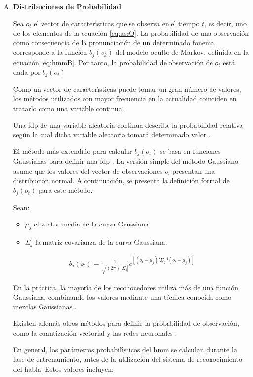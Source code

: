 \begin{enumerate}[A)]
	\item \textbf{Distribuciones de Probabilidad}

	Sea $o_t$ el vector de caracter{\'\i}sticas que se observa en el tiempo $t$, es decir, uno de los elementos
	de la ecuaci\'on \ref{eq:asrO}.
	La probabilidad de una observaci\'on como consecuencia de la pronunciaci\'on de un determinado fonema 
	corresponde a la funci\'on $b_j(v_k)$ del modelo oculto de Markov, definida en la ecuaci\'on \ref{eq:hmmB}.
	Por tanto, la probabilidad de observaci\'on de $o_t$ est\'a dada por $b_j(o_t)$ 

	Como un vector de caracter{\'\i}sticas puede tomar un gran n\'umero de valores, los m\'etodos utilizados con
	mayor frecuencia en la actualidad coinciden en tratarlo como una variable continua.

	Una \gls{fdp} de una variable aleatoria continua describe la probabilidad relativa seg\'un la cual 
	dicha variable aleatoria tomar\'a determinado valor \cite{Evans2011}.

	El m\'etodo m\'as extendido para calcular $b_j(o_t)$ se basa en funciones Gaussianas para definir 
	una \gls{fdp} \cite{Jurafsky}.
	La versi\'{o}n simple del m\'etodo Gaussiano asume que los valores del vector de observaciones $o_t$ presentan una distribuci\'on normal. A continuaci\'on, se presenta la definici\'on formal 
	de $b_j(o_t)$ para este m\'etodo.

	Sean:

	\begin{itemize}
		\item $\mu_j$ el vector media de la curva Gaussiana.
		\item $\Sigma_j$ la matriz covarianza de la curva Gaussiana.
	\end{itemize}

	\begin{align}
    	b_j(o_t) = \frac{1}{\sqrt{(2\pi)|\Sigma_j|}}e^{[(o_t-\mu_j)'\Sigma_j^{-1}(o_t-\mu_j)]}\label{eq:hmmGaussian}
	\end{align}

	En la pr\'actica, la mayor{\'\i}a de los reconocedores utiliza m\'as de una funci\'on Gaussiana, combinando
	los valores mediante una t\'ecnica conocida como mezclas Gaussianas \cite{huang-handbook10}.

	Existen adem\'as otros m\'etodos para definir la probabilidad de observaci\'on, como la cuantizaci\'on
	vectorial \cite{Burton1983} y las redes neuronales \cite{KristineApplying1995}.

	En general, los par\'ametros probabil{\'\i}sticos del \gls{hmm} se calculan durante la fase de entrenamiento,
	antes de la utilizaci\'on del sistema de reconocimiento del habla. Estos valores incluyen:


\end{enumerate}
